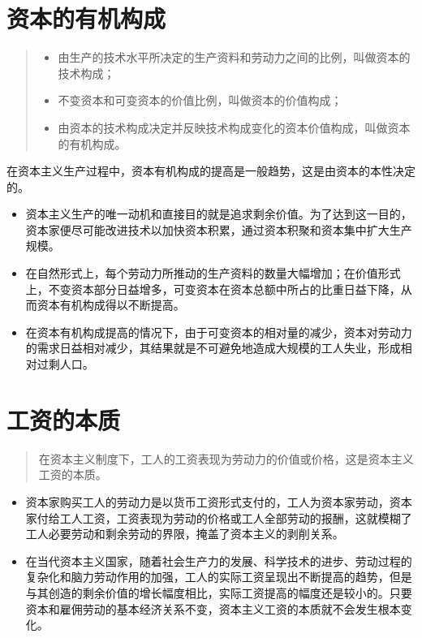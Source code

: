 \documentclass[
]{article}
\begin{document}
\hypertarget{ux8d44ux672cux7684ux6709ux673aux6784ux6210}{%
\section{资本的有机构成}\label{ux8d44ux672cux7684ux6709ux673aux6784ux6210}}

\begin{quote}
\begin{itemize}
\item
  由生产的技术水平所决定的生产资料和劳动力之间的比例，叫做资本的技术构成；
\item
  不变资本和可变资本的价值比例，叫做资本的价值构成；
\item
  由资本的技术构成决定并反映技术构成变化的资本价值构成，叫做资本的有机构成。
\end{itemize}
\end{quote}

在资本主义生产过程中，资本有机构成的提高是一般趋势，这是由资本的本性决定的。

\begin{itemize}
\item
  资本主义生产的唯一动机和直接目的就是追求剩余价值。为了达到这一目的，资本家便尽可能改进技术以加快资本积累，通过资本积聚和资本集中扩大生产规模。
\item
  在自然形式上，每个劳动力所推动的生产资料的数量大幅增加；在价值形式上，不变资本部分日益增多，可变资本在资本总额中所占的比重日益下降，从而资本有机构成得以不断提高。
\item
  在资本有机构成提高的情况下，由于可变资本的相对量的减少，资本对劳动力的需求日益相对减少，其结果就是不可避免地造成大规模的工人失业，形成相对过剩人口。
\end{itemize}

\hypertarget{ux5de5ux8d44ux7684ux672cux8d28}{%
\section{工资的本质}\label{ux5de5ux8d44ux7684ux672cux8d28}}

\begin{quote}
在资本主义制度下，工人的工资表现为劳动力的价值或价格，这是资本主义工资的本质。
\end{quote}

\begin{itemize}
\item
  资本家购买工人的劳动力是以货币工资形式支付的，工人为资本家劳动，资本家付给工人工资，工资表现为劳动的价格或工人全部劳动的报酬，这就模糊了工人必要劳动和剩余劳动的界限，掩盖了资本主义的剥削关系。
\item
  在当代资本主义国家，随着社会生产力的发展、科学技术的进步、劳动过程的复杂化和脑力劳动作用的加强，工人的实际工资呈现出不断提高的趋势，但是与其创造的剩余价值的增长幅度相比，实际工资提高的幅度还是较小的。只要资本和雇佣劳动的基本经济关系不变，资本主义工资的本质就不会发生根本变化。
\end{itemize}
\end{document}
